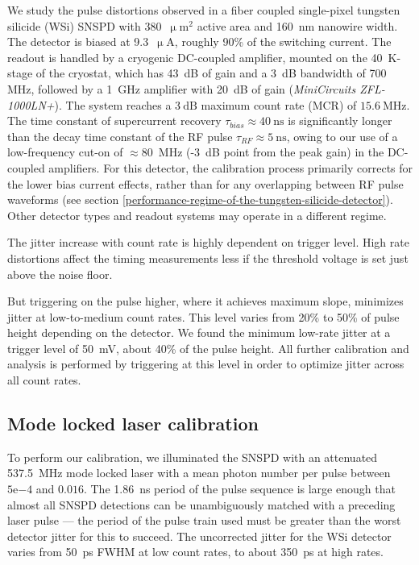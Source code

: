 \documentclass[11pt]{caltech_thesis} %
\begin{document}
We study the pulse distortions observed in a fiber coupled single-pixel tungsten silicide (WSi) SNSPD with 380~$\mathrm{\upmu m^2}$ active area and 160~nm nanowire width. The detector is biased at 9.3~$\mathrm{\upmu A}$, roughly 90\% of the switching current. The readout is handled by a cryogenic DC-coupled amplifier, mounted on the 40~K-stage of the cryostat, which has 43~dB of gain and a 3~dB bandwidth of 700 MHz, followed by a 1~GHz amplifier with 20~dB of gain (\emph{MiniCircuits ZFL-1000LN+}). The system reaches a $3~\mathrm{dB}$ maximum count rate (MCR) of $15.6~\mathrm{MHz}$. The time constant of supercurrent recovery $\tau_{bias} \approx 40~\mathrm{ns}$ is significantly longer than the decay time constant of the RF pulse $\tau_{RF} \approx 5~\mathrm{ns}$, owing to our use of a low-frequency cut-on of $\approx 80$~MHz (-3~dB point from the peak gain) in the DC-coupled amplifiers. For this detector, the calibration process primarily corrects for the lower bias current effects, rather than for any overlapping between RF pulse waveforms (see section \ref{performance-regime-of-the-tungsten-silicide-detector}). Other detector types and readout systems may operate in a different regime.

The jitter increase with count rate is highly dependent on trigger level. High rate distortions affect the timing measurements less if the threshold voltage is set just above the noise floor.

But triggering on the pulse higher, where it achieves maximum slope, minimizes jitter at low-to-medium count rates. This level varies from 20\% to 50\% of pulse height depending on the detector. We found the minimum low-rate jitter at a trigger level of 50~mV, about 40\% of the pulse height. All further calibration and analysis is performed by triggering at this level in order to optimize jitter across all count rates.

\hypertarget{mode-locked-laser-calibration}{%
\subsection{Mode locked laser calibration}\label{mode-locked-laser-calibration}}

To perform our calibration, we illuminated the SNSPD with an attenuated 537.5~MHz mode locked laser with a mean photon number per pulse between $5\mathrm{e}{-4}$ and $0.016$. The 1.86~ns period of the pulse sequence is large enough that almost all SNSPD detections can be unambiguously matched with a preceding laser pulse --- the period of the pulse train used must be greater than the worst detector jitter for this to succeed. The uncorrected jitter for the WSi detector varies from 50~ps FWHM at low count rates, to about 350~ps at high rates.
\end{document}
